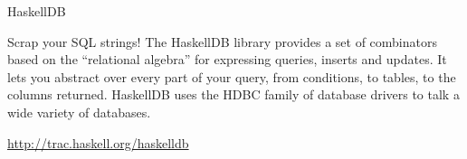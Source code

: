 \begin{hcarentry}{HaskellDB}
\makeheader 

Scrap your SQL strings! The HaskellDB library provides a set of
combinators based on the ``relational algebra'' for expressing
queries, inserts and updates. It lets you abstract over every part of
your query, from conditions, to tables, to the columns
returned. HaskellDB uses the HDBC family of database drivers to talk a
wide variety of databases.

\FurtherReading
  \url{http://trac.haskell.org/haskelldb}
\end{hcarentry}
